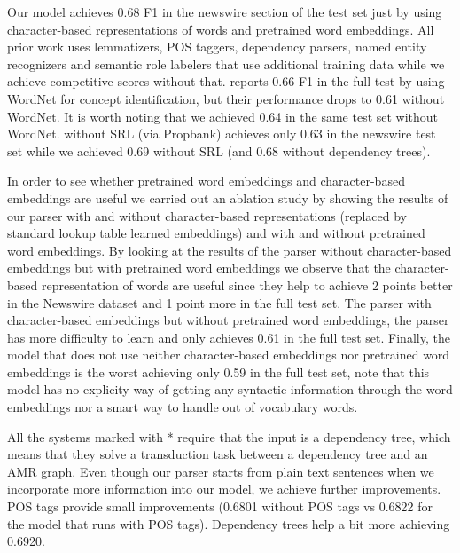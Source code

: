 \documentclass[11pt,a4paper]{article}
\begin{document}
Our model achieves 0.68 F1 in the newswire section of the test set just by using character-based 
representations of words and pretrained word embeddings. All prior work uses lemmatizers, 
POS taggers, dependency parsers, named entity recognizers and semantic role labelers that 
use additional training data while we achieve competitive scores without that. 
 reports 0.66 F1 in the full test by using WordNet for concept identification,
 but their performance drops to 0.61 without WordNet. It is worth noting that we achieved 
 0.64 in the same test set without WordNet.
 without SRL (via Propbank) achieves only 0.63 in 
the newswire test set while we achieved 0.69 without SRL (and 0.68 without dependency 
trees).

In order to see whether pretrained word embeddings and character-based embeddings are useful we
carried out an ablation 
study by showing the results of our parser with and without 
character-based representations (replaced by standard lookup table learned embeddings) 
and with and without pretrained word embeddings. 
By looking at the results of the parser without character-based embeddings but with pretrained word 
embeddings we observe that the character-based representation of words are useful since they help to 
achieve 2 points better in the Newswire dataset and 1 point more in the full 
test set. The parser with character-based embeddings but without 
pretrained word embeddings, the parser has more difficulty to learn and only 
achieves 0.61 in the full test set. Finally, the model that does not use neither 
character-based embeddings nor pretrained word embeddings is the worst achieving only 0.59 in the 
full test set, note that this model has no explicity way of getting any syntactic information through the 
word embeddings nor a smart way to handle out of vocabulary words. 

All the systems marked with * require that the input is a dependency tree, which means that they solve a 
transduction task between a dependency tree and an AMR graph.  Even though our parser starts from
plain text sentences when we incorporate more information into our model, we achieve further 
improvements. POS tags provide small improvements (0.6801 without POS tags vs 0.6822 
for the model that runs with POS tags). Dependency trees help a bit more achieving 0.6920.
\end{document}
